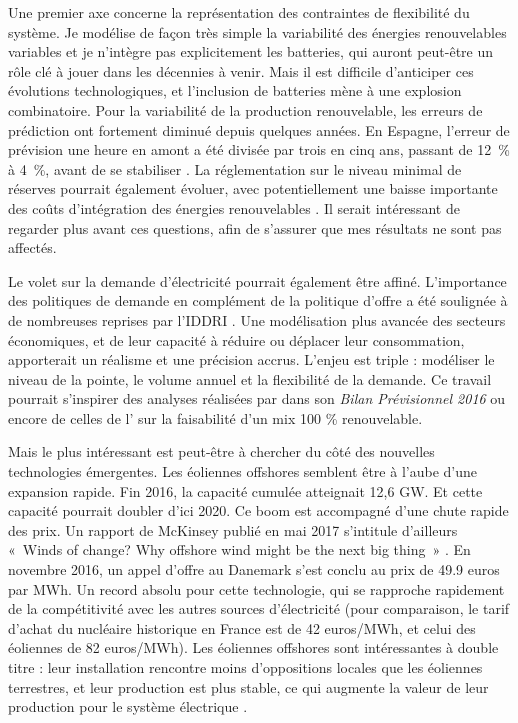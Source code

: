 Une premier axe concerne la représentation des contraintes de flexibilité du système. Je modélise de façon très simple la variabilité des énergies renouvelables variables et je n'intègre pas explicitement les batteries, qui auront peut-être un rôle clé à jouer dans les décennies à venir. Mais il est difficile d'anticiper ces évolutions technologiques, et l'inclusion de batteries mène à une explosion combinatoire. 
Pour la variabilité de la production renouvelable, les erreurs de prédiction ont fortement diminué depuis quelques années. En Espagne, l’erreur de prévision une heure en amont a été divisée par trois en cinq ans, passant de 12~\% à 4~\%, avant de se stabiliser \citep{IRENA2017}. La réglementation sur le niveau minimal de réserves pourrait également évoluer, avec potentiellement une baisse importante des coûts d'intégration des énergies renouvelables \citep{Lorenz2017}. Il serait intéressant de regarder plus avant ces questions, afin de s’assurer que mes résultats ne sont pas affectés. 

Le volet sur la demande d’électricité pourrait également être affiné. L’importance des politiques de demande en complément de la politique d’offre a été soulignée à de nombreuses reprises par l'IDDRI \citep{Berghmans2017, Rudinger2017}. Une modélisation plus avancée des secteurs économiques, et de leur capacité à réduire ou déplacer leur consommation, apporterait un réalisme et une précision accrus. L'enjeu est triple : modéliser le niveau de la pointe, le volume annuel et la flexibilité de la demande. Ce travail pourrait s'inspirer des analyses réalisées par \citet{RTE2016} dans son \textit{Bilan Prévisionnel 2016} ou encore de celles de l'\citet{ADEME2015} sur la faisabilité d'un mix 100 \% renouvelable.

Mais le plus intéressant est peut-être à chercher du côté des nouvelles technologies émergentes. 
Les éoliennes offshores semblent être à l’aube d’une expansion rapide. Fin 2016, la capacité cumulée atteignait 12,6 GW. Et cette capacité pourrait doubler d’ici 2020. Ce boom est accompagné d’une chute rapide des prix. Un rapport de McKinsey publié en mai 2017 s’intitule d’ailleurs «~Winds of change? Why offshore wind might be the next big thing~» \citep{McKinsey2017Wind}. En novembre 2016, un appel d’offre au Danemark s’est conclu au prix de 49.9 euros par MWh. Un record absolu pour cette technologie, qui se rapproche rapidement de la compétitivité avec les autres sources d’électricité (pour comparaison, le tarif d'achat du nucléaire historique en France est de 42 euros/MWh, et celui des éoliennes de 82 euros/MWh). Les éoliennes offshores sont intéressantes à double titre : leur installation rencontre moins d’oppositions locales que les éoliennes terrestres, et leur production est plus stable, ce qui augmente la valeur de leur production pour le système électrique \citep{Hirth2016}.

